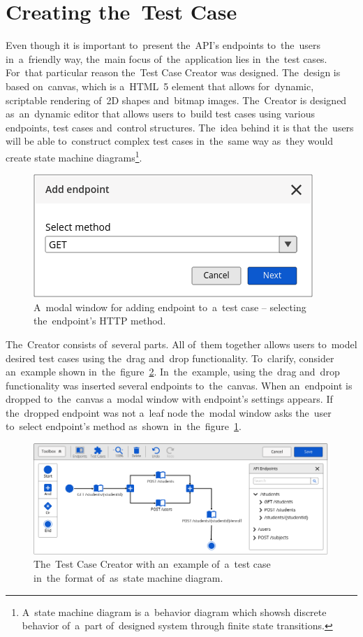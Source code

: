 \section{Creating the~Test Case}
Even though it is important to~present the~API's endpoints to~the~users
in~a~friendly way, the~main focus of~the~application lies in~the~test cases.
For~that particular reason the~Test Case Creator was designed. The~design is
based on~canvas, which is a~HTML~5 element that allows for~dynamic, scriptable
rendering of~2D shapes and~bitmap images. The~Creator is designed as~an~dynamic
editor that allows users to~build test cases using various endpoints, test cases
and~control structures. The~idea behind it is that the~users will be able
to~construct complex test cases in~the~same way as~they would create state
machine diagrams\footnote{A~state machine diagram is a~behavior diagram which
showsh discrete behavior of~a~part of~designed system through finite state
transitions.}.

\begin{figure}[!hbt]
	\centering
	\includegraphics[scale=0.4]{./designs/drafts-1.0/add-endpoint-1.png}
	\caption{A~modal window for adding endpoint to~a~test case -- selecting
	the~endpoint's HTTP method.}
	\label{add-endpoint-1}
\end{figure}

The~Creator consists of~several parts. All of~them together allows users
to~model desired test cases using the~drag and~drop functionality. To~clarify,
consider an~example shown in~the~figure~\ref{test-case-creator}. In~the~example,
using the~drag and~drop functionality was inserted several endpoints
to~the~canvas. When an~endpoint is dropped to~the~canvas a~modal window with
endpoint's settings appears. If the~dropped endpoint was not a~leaf node
the~modal window asks the~user to~select endpoint's method
as~shown~in~the~figure~\ref{add-endpoint-1}.

\begin{figure}[!hbt]
	\centering
	\includegraphics[scale=0.4]{./designs/drafts-1.0/test-case-creator.png}
	\caption{The~Test Case Creator with an~example of~a~test case in~the~format
	of~as~state machine diagram.}
	\label{test-case-creator}
\end{figure}

